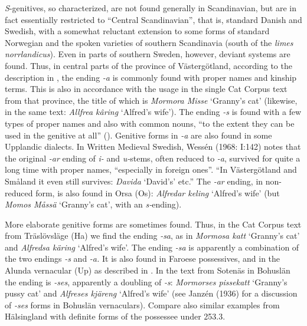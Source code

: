 \begin{styleBodytextC}
\textit{S}{}-genitives, so characterized, are not found generally in Scandinavian, but are in fact essentially restricted to “Central Scandinavian”, that is, standard Danish and Swedish, with a somewhat reluctant extension to some forms of standard Norwegian and the spoken varieties of southern Scandinavia (south of the \textit{limes norrlandicus}). Even in parts of southern Sweden, however, deviant systems are found. Thus, in central parts of the province of Västergötland, according to the description in \citet{Landtmanson1952}, the ending\textit{ -a} is commonly found with proper names and kinship terms. This is also in accordance with the usage in the single Cat Corpus text from that province, the title of which is \textit{Mormora Misse} ‘Granny’s cat’ (likewise, in the same text: \textit{Allfrea kâring} ‘Alfred’s wife’). The ending\textit{ -s} is found with a few types of proper names and also with common nouns, “to the extent they can be used in the genitive at all” (\citet[68]{Landtmanson1952}). Genitive forms in\textit{ -a} are also found in some Upplandic dialects. In Written Medieval Swedish, Wessén (1968: I:142) notes that the original\textit{ -a}\textit{r} ending of \textit{i-} and \textit{u-}stems, often reduced to\textit{ -a},  survived for quite a long time with proper names, “especially in foreign ones”. “In Västergötland and Småland it even still survives: \textit{Davida} ‘David’s’ etc.” The\textit{ -a}\textit{r} ending, in non-reduced form, is also found in Orsa (Os): \textit{Alfredar keling} ‘Alfred’s wife’ (but \textit{Momos Måssä} ‘Granny’s cat’, with an \textit{s-}ending).

\end{styleBodytextC}

\begin{styleBodytextC}
 More elaborate genitive forms are sometimes found. Thus, in the Cat Corpus text from Träslövsläge (Ha) we find the ending\textit{ -s}\textit{a}, as in \textit{Mormosa katt }‘Granny’s cat’ and \textit{Alfredsa käring }‘Alfred’s wife’. The ending\textit{ -s}\textit{a} is apparently a combination of the two endings\textit{ -s} and\textit{ -a}\textit{. }It is also found in Faroese possessives, and in the Alunda vernacular (Up) as described in \citet{Bergman1893}. In the text from Sotenäs in Bohuslän the ending is\textit{ -s}\textit{es}, apparently a doubling of\textit{ -s}: \textit{Mormorses pissekatt} ‘Granny’s pussy cat’ and \textit{Alfreses kjäreng} ‘Alfred’s wife’ (see Janzén (1936) for a discussion of\textit{ -s}\textit{es} forms in Bohuslän vernaculars). Compare also similar examples from Hälsingland with definite forms of the possessee under 253.3. 

\end{styleBodytextC}

